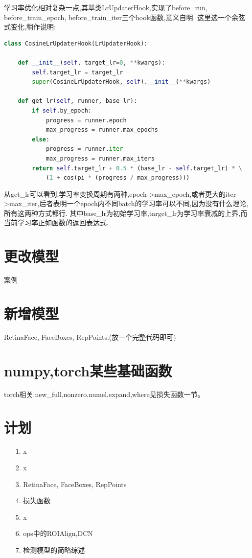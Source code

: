 \documentclass[UTF8]{ctexart}
\begin{document}
学习率优化相对复杂一点,其基类LrUpdaterHook,实现了before\_run, before\_train\_epoch, before\_train\_iter三个hook函数,意义自明.
这里选一个余弦式变化,稍作说明:

\lstset{style=mystyle}
\begin{lstlisting}[language=Python]
class CosineLrUpdaterHook(LrUpdaterHook):

    def __init__(self, target_lr=0, **kwargs):
        self.target_lr = target_lr
        super(CosineLrUpdaterHook, self).__init__(**kwargs)

    def get_lr(self, runner, base_lr):
        if self.by_epoch:
            progress = runner.epoch
            max_progress = runner.max_epochs
        else:
            progress = runner.iter
            max_progress = runner.max_iters
        return self.target_lr + 0.5 * (base_lr - self.target_lr) * \
			(1 + cos(pi * (progress / max_progress)))
\end{lstlisting}
从get\_lr可以看到,学习率变换周期有两种,epoch->max\_epoch,或者更大的iter->max\_iter,后者表明一个epoch内不同batch的学习率可以不同,因为没有什么理论,所有这两种方式都行.
其中base\_lr为初始学习率,target\_lr为学习率衰减的上界,而当前学习率正如函数的返回表达式.

\section{更改模型}
案例

\section{新增模型}
RetinaFace, FaceBoxes, RepPoints.(放一个完整代码即可)

\section{numpy,torch某些基础函数}
\label{sec:basefunc}
torch相关:new\_full,nonzero,numel,expand,where见损失函数一节。

\section{计划}
\begin{itemize}
	\item[1.] x
	\item[2.] x
	\item [3.] RetinaFace, FaceBoxes, RepPoints
	\item [4.] 损失函数
	\item [5.] x
	\item [6.] ops中的ROIAlign,DCN
	\item [7.] 检测模型的简略综述
\end{itemize}
\end{document}

